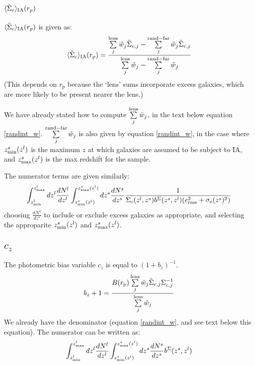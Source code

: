 \documentclass[onecolumn,amsmath,aps,fleqn, superscriptaddress]{revtex4}
\begin{document}
\subsection*{$\langle \tilde{\Sigma}_c\rangle_{\rm IA}(r_p)$}

$\langle \tilde{\Sigma}_c\rangle_{\rm IA}(r_p)$ is given as:
\begin{equation}
\langle \tilde{\Sigma}_c\rangle_{\rm IA} (r_p) = \frac{\sum\limits_{j}^{\rm lens} \tilde{w}_j \tilde{\Sigma}_{c,j}- \sum\limits_{j}^{\rm rand-far} \tilde{w}_j \tilde{\Sigma}_{c,j}}{\sum\limits_{j}^{\rm lens} \tilde{w}_j - \sum\limits_{j}^{\rm rand-far} \tilde{w}_j}
\label{SigmaIA}
\end{equation}
(This depends on $r_p$ because the `lens' sums incorporate excess galaxies, which are more likely to be present nearer the lens.)

We have already stated how to compute $\sum\limits_{j}^{\rm lens} \tilde{w}_j$, in the text below equation \ref{randint_w}. $\sum\limits_{j}^{\rm rand-far} \tilde{w}_j$ is also given by equation \ref{randint_w}, in the case where $z^s_{\rm min}(z^l)$ is the maximum $z$ at which galaxies are assumed to be subject to IA, and $z^s_{\rm max}(z^l)$ is the max redshift for the sample.

The numerator terms are given similarly:
\begin{equation}
\int_{z^l_{\rm min}}^{z^l_{\rm max}}dz^l \frac{dN^l}{dz^l} \int_{z^s_{\rm min}(z^l)}^{z^s_{\rm max}(z^l)}dz^s \frac{dN^s}{dz^s} \frac{1}{\Sigma_c(z^l , z^s) b^{\Sigma}(z^s,z^l) (e_{\rm rms}^2 + \sigma_e(z^s)^2)}
\label{randint_wSig}
\end{equation}
choosing $\frac{dN^s}{dz^s}$ to include or exclude excess galaxies as appropriate, and selecting the approparite $z^s_{\rm min}(z^l)$ and $z^s_{\rm max}(z^l)$.

\subsection*{$c_z$}

The photometric bias variable $c_z$ is equal to $(1+b_z)^{-1}$.
\begin{equation}
b_z+1 = \frac{B(r_p) \sum\limits^{\rm lens}_{j} \tilde{w}_j \tilde{\Sigma}_{c,j} \Sigma_{c,j}^{-1}}{\sum\limits^{\rm lens}_{j} \tilde{w}_j}
\label{photozbias}
\end{equation}
We already have the denominator (equation \ref{randint_w}, and see text below this equation). The numerator can be written as:
\begin{equation}
\int_{z^l_{\rm min}}^{z^l_{\rm max}}dz^l \frac{dN^l}{dz^l} \int_{z^s_{\rm min}(z^l)}^{z^s_{\rm max}(z^l)}dz^s \frac{dN^s}{dz^s} b^\Sigma(z^s, z^l)
\label{photoz}
\end{equation}
\end{document}
